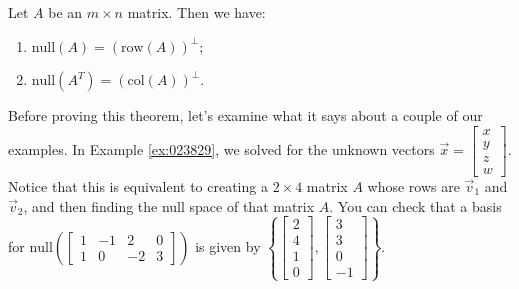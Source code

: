 \documentclass{ximera}
\begin{document}
\begin{theorem}\label{th:4subspaces}
Let $A$ be an $m \times n$ matrix.  Then we have:
\begin{enumerate}
\item\label{th:4subspacesa} $\mbox{null}(A) = (\mbox{row}(A))^\perp$;
\item\label{th:4subspacesb} $\mbox{null}(A^T) = (\mbox{col}(A))^\perp$.
\end{enumerate}
\end{theorem}

Before proving this theorem, let's examine what it says about a couple of our examples.  In Example \ref{ex:023829}, we solved for the unknown vectors $\vec{x} = \begin{bmatrix}
  x \\ y \\ z \\ w
  \end{bmatrix}$. Notice that this is equivalent to creating a $2 \times 4$ matrix $A$ whose rows are $\vec{v}_1$ and $\vec{v}_2$, and then finding the null space of that matrix $A$.  You can check that a basis for $\mbox{null}\left(\begin{bmatrix}
  1 & -1 & 2 & 0 \\
  1 & 0 & -2 & 3
  \end{bmatrix}\right)$
is given by $\left\{\begin{bmatrix}
  2 \\ 4 \\ 1 \\ 0
  \end{bmatrix},
  \begin{bmatrix}
  3 \\ 3 \\ 0 \\ -1
  \end{bmatrix}\right\}$.
\end{document}
